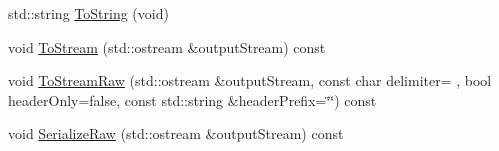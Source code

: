 \begin{DoxyCompactItemize}
\item 
std\+::string \hyperlink{classvct_dynamic_const_matrix_base_acf0a7ab83b179fd10e9d8d2c3f225776}{To\+String} (void)
\item 
void \hyperlink{classvct_dynamic_const_matrix_base_a1e37319e20d2ce31505198d20d603913}{To\+Stream} (std\+::ostream \&output\+Stream) const 
\item 
void \hyperlink{classvct_dynamic_const_matrix_base_a7c96887913c708eaa04ec3c2a2ce8713}{To\+Stream\+Raw} (std\+::ostream \&output\+Stream, const char delimiter= \textquotesingle{} \textquotesingle{}, bool header\+Only=false, const std\+::string \&header\+Prefix=\char`\"{}\char`\"{}) const 
\item 
void \hyperlink{classvct_dynamic_const_matrix_base_a837a83daae56896cf332dce9c004a0ed}{Serialize\+Raw} (std\+::ostream \&output\+Stream) const 
\end{DoxyCompactItemize}
